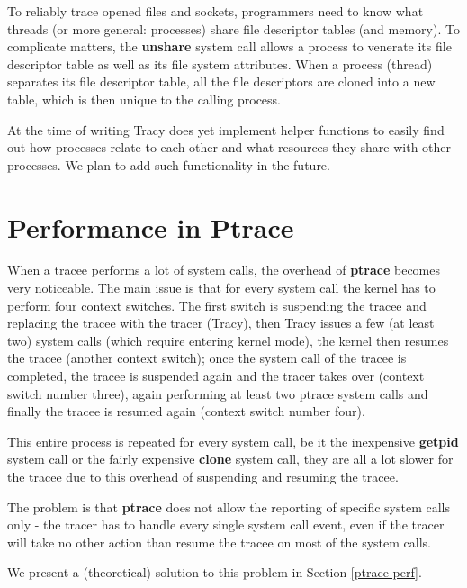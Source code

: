 \documentclass[a4paper, 10pt]{report}
\begin{document}
To reliably trace opened files and sockets, programmers need to know what
threads (or more general: processes) share file descriptor tables (and memory).
To complicate matters, the \textbf{unshare} system call allows a process to
venerate its file descriptor table as well as its file system attributes. When a
process (thread) separates its file descriptor table, all the file descriptors
are cloned into a new table, which is then unique to the calling process.

At the time of writing Tracy does yet implement helper functions to easily find
out how processes relate to each other and what resources they share with
other processes. We plan to add such functionality in the future.


\section{Performance in Ptrace}
\label{ptrace-perf-problems}

When a tracee performs a lot of system calls, the overhead of \textbf{ptrace}
becomes very noticeable. The main issue is that for every system call the kernel
has to perform four context switches. The first switch is suspending the tracee
and replacing the tracee with the tracer (Tracy), then Tracy issues a few
(at least two) system calls (which require entering kernel mode),
the kernel then resumes the tracee (another context switch); once the system
call of the tracee is completed, the tracee is suspended again and the tracer
takes over (context switch number three), again performing at least two ptrace
system calls and finally the tracee is resumed again (context switch number four).

This entire process is repeated for every system call, be it the
inexpensive \textbf{getpid} system call or the fairly expensive
\textbf{clone} system call, they are all a lot slower for the tracee
due to this overhead of suspending and resuming the tracee.

The problem is that \textbf{ptrace} does not allow the reporting of specific
system calls only - the tracer has to handle every single system call event,
even if the tracer will take no other action than resume the tracee on most
of the system calls.

We present a (theoretical) solution to this problem in
Section \ref{ptrace-perf}.
\end{document}
